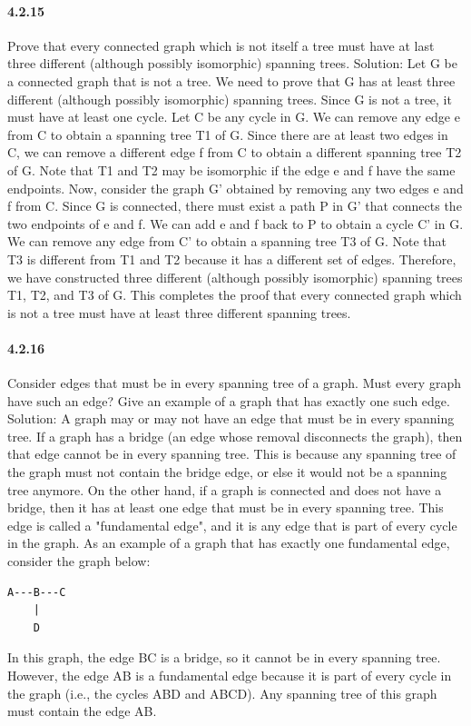 \documentclass{article}
\begin{document}
\paragraph{4.2.15}
Prove that every connected graph which is not itself a tree must have at last three different (although possibly isomorphic) spanning trees.\newline
Solution:\newline
Let G be a connected graph that is not a tree. We need to prove that G has at least three different (although possibly isomorphic) spanning trees.
\newline
Since G is not a tree, it must have at least one cycle. Let C be any cycle in G. We can remove any edge e from C to obtain a spanning tree T1 of G. Since there are at least two edges in C, we can remove a different edge f from C to obtain a different spanning tree T2 of G. Note that T1 and T2 may be isomorphic if the edge e and f have the same endpoints.
\newline
Now, consider the graph G' obtained by removing any two edges e and f from C. Since G is connected, there must exist a path P in G' that connects the two endpoints of e and f. We can add e and f back to P to obtain a cycle C' in G. We can remove any edge from C' to obtain a spanning tree T3 of G. Note that T3 is different from T1 and T2 because it has a different set of edges.
\newline
Therefore, we have constructed three different (although possibly isomorphic) spanning trees T1, T2, and T3 of G. This completes the proof that every connected graph which is not a tree must have at least three different spanning trees.
\paragraph{4.2.16}Consider edges that must be in every spanning tree of a graph. Must every graph have such an edge? Give an example of a graph that has exactly one such edge.\newline
Solution:\newline
A graph may or may not have an edge that must be in every spanning tree.
\newline
If a graph has a bridge (an edge whose removal disconnects the graph), then that edge cannot be in every spanning tree. This is because any spanning tree of the graph must not contain the bridge edge, or else it would not be a spanning tree anymore.
\newline
On the other hand, if a graph is connected and does not have a bridge, then it has at least one edge that must be in every spanning tree. This edge is called a "fundamental edge", and it is any edge that is part of every cycle in the graph.
\newline
As an example of a graph that has exactly one fundamental edge, consider the graph below:\newline
\begin{lstlisting}
A---B---C
    |
    D
\end{lstlisting}
In this graph, the edge BC is a bridge, so it cannot be in every spanning tree. However, the edge AB is a fundamental edge because it is part of every cycle in the graph (i.e., the cycles ABD and ABCD). Any spanning tree of this graph must contain the edge AB.
\end{document}
